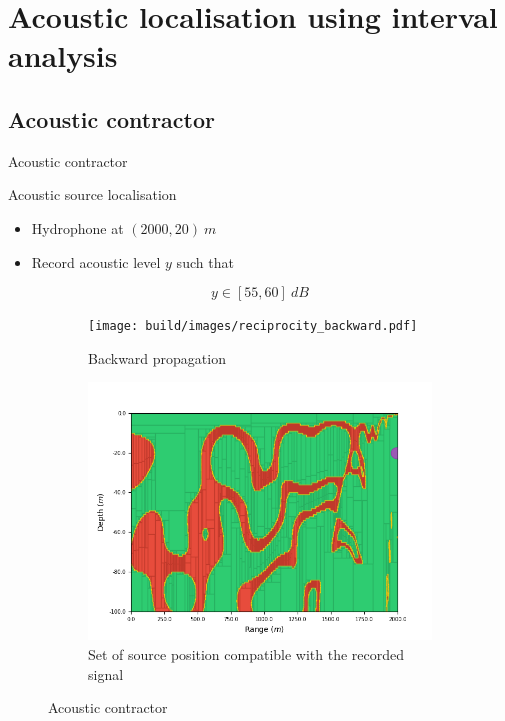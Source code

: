 \documentclass[9pt, xcolor={usenames, dvipsnames}]{beamer}
\begin{document}
		\section{Acoustic localisation using interval analysis}

			\subsection{Acoustic contractor}

			\begin{frame}{Acoustic contractor}
				\centering
				\begin{minipage}{0.5\textwidth}
					\begin{exampleblock}{Acoustic source localisation}
						\begin{itemize}
							\item Hydrophone at $(2000, 20)\ m$
							\item Record acoustic level $y$ such that
						\end{itemize}
						\begin{equation}
							y \in [55, 60]\ dB
						\end{equation}
					\end{exampleblock}
				\end{minipage}
				\hfill
				\begin{minipage}{0.36\textwidth}
					\begin{figure}[!htb]
						\begin{subfigure}[!htb]{\textwidth}
							\texttt{[image: build/images/reciprocity\_backward.pdf]}
							\caption{Backward propagation}
						\end{subfigure}
						\begin{subfigure}[!htb]{\textwidth}
							\includegraphics[width=\textwidth]{images/localisation/Hydrophone_20_2000.png}
							\caption{Set of source position compatible with the recorded signal}
						\end{subfigure}
						\caption{Acoustic contractor}
					\end{figure}
				\end{minipage}
			\end{frame}
\end{document}
